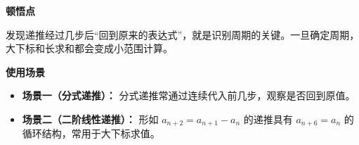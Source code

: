 \begin{explanationbox}
	\medskip
	\textbf{\textcolor{CExplanation}{顿悟点}}

	发现递推经过几步后“回到原来的表达式”，就是识别周期的关键。一旦确定周期，大下标和长求和都会变成小范围计算。

	\medskip
	\textbf{\textcolor{CExplanation}{使用场景}}
	\begin{itemize}[leftmargin=*, itemsep=0.5em, topsep=0.4em]
		\item \textbf{场景一（分式递推）：} 分式递推常通过连续代入前几步，观察是否回到原值。
		\item \textbf{场景二（二阶线性递推）：} 形如 \(a_{n+2}=a_{n+1}-a_n\) 的递推具有 \(a_{n+6}=a_n\) 的循环结构，常用于大下标求值。
	\end{itemize}
\end{explanationbox}